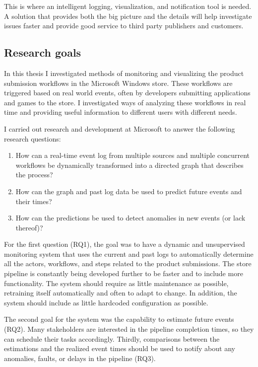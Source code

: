 \documentclass[english,12pt,a4paper,pdftex,sci,utf8]{aaltothesis}
\begin{document}
This is where an intelligent logging, visualization, and notification tool is needed. 
A solution that provides both the big picture and the details will help investigate issues faster and
provide good service to third party publishers and customers.

\subsection{Research goals}
In this thesis I investigated methods of monitoring and visualizing the product submission workflows in the Microsoft Windows store.
These workflows are triggered based on real world events, often by developers submitting applications and games to the store.
I investigated ways of analyzing these workflows in real time and providing useful information to different users with different needs. 

I carried out research and development at Microsoft to answer the following research questions:

\begin{enumerate}[label=RQ\arabic*]
    \item How can a real-time event log from multiple sources and multiple concurrent workflows be dynamically transformed into a directed graph that describes the process? 
    \item How can the graph and past log data be used to predict future events and their times?
    \item How can the predictions be used to detect anomalies in new events (or lack thereof)?
\end{enumerate}

For the first question (RQ1), the goal was to have a dynamic and unsupervised monitoring system 
that uses the current and past logs to automatically determine all the actors, 
workflows, and steps related to the product submissions.
The store pipeline is constantly being developed further to be faster and to include more functionality.
The system should require as little maintenance as possible, retraining itself automatically and often to adapt to change.
In addition, the system should include as little hardcoded configuration as possible.

The second goal for the system was the capability to estimate future events (RQ2). 
Many stakeholders are interested in the pipeline completion times, so they can schedule their tasks accordingly.
Thirdly, comparisons between the estimations and the realized event times should be used to notify 
about any anomalies, faults, or delays in the pipeline (RQ3).
\end{document}

